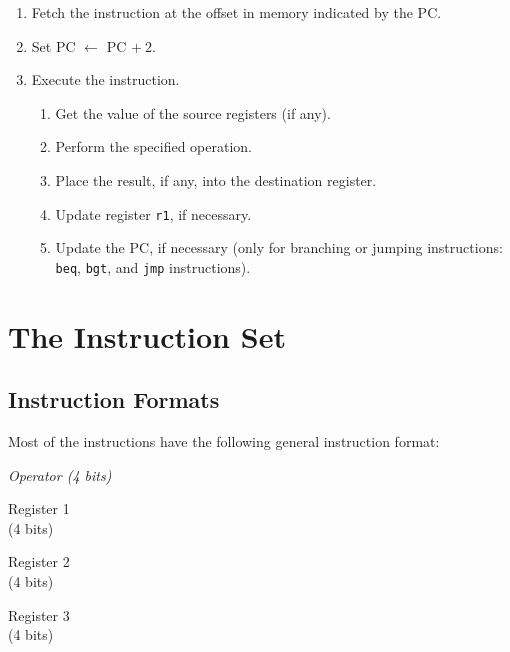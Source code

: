 \begin{enumerate}

\item Fetch the instruction at the offset in memory indicated
	by the {\sc PC}.

\item Set {\sc PC} $\leftarrow$ {\sc PC} $+ ~ 2$.

\item Execute the instruction.

	\begin{enumerate}
 
	\item Get the value of the source registers (if any).

	\item Perform the specified operation.

	\item Place the result, if any, into the destination register.

	\item Update register {\tt r1}, if necessary.

	\item Update the {\sc PC}, if necessary (only for branching or
			jumping instructions:  {\tt beq}, {\tt bgt}, and
			{\tt jmp} instructions).

	\end{enumerate}

\end{enumerate}

\section{The Instruction Set}

\subsection{Instruction Formats}
  
Most of the instructions have the following general instruction format:

\newcommand{\OPCODE}{{\em Operator \newline (4 bits)}}

\begin{description}

\item {}
	{\parbox[t]{0.7in} \OPCODE }
	{\parbox[t]{0.7in}{Register 1 \\ (4 bits) }}
	{\parbox[t]{0.7in}{Register 2 \\ (4 bits) }}
	{\parbox[t]{0.7in}{Register 3 \\ (4 bits) }}
\end{description}

